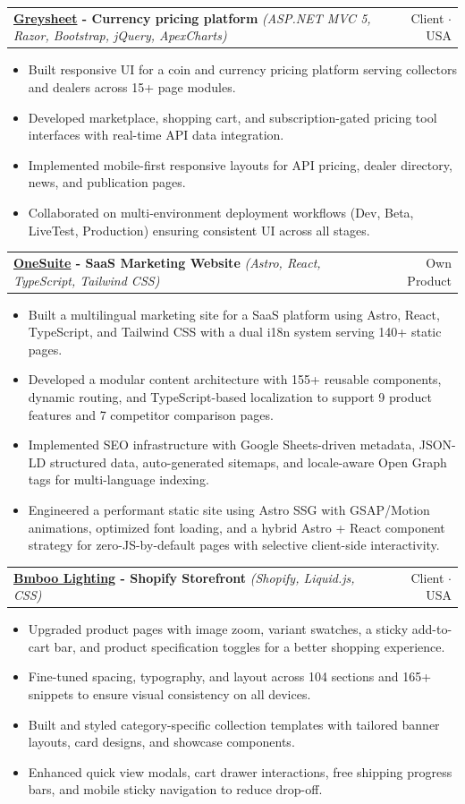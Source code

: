 \documentclass[10pt,letterpaper]{article}
\makeatletter
\newcommand{\project}[3]{%
  \begin{tabularx}{\textwidth}{@{}X r@{}}
    \textbf{#1} \textit{#2} & \hspace{1em}#3 \\
  \end{tabularx}\par\vspace{0pt}}
\makeatother
\begin{document}
\project{\href{https://greysheet.com}{Greysheet} - Currency pricing platform}{(ASP.NET MVC 5, Razor, Bootstrap, jQuery, ApexCharts)}{Client $\cdot$ USA}
\begin{itemize}
  \item Built responsive UI for a coin and currency pricing platform serving collectors and dealers across 15+ page modules.
  \item Developed marketplace, shopping cart, and subscription-gated pricing tool interfaces with real-time API data integration.
  \item Implemented mobile-first responsive layouts for API pricing, dealer directory, news, and publication pages.
  \item Collaborated on multi-environment deployment workflows (Dev, Beta, LiveTest, Production) ensuring consistent UI across all stages.
\end{itemize}
\vspace{3pt}

\project{\href{https://onesuite.io}{OneSuite} - SaaS Marketing Website}{(Astro, React, TypeScript, Tailwind CSS)}{Own Product}
\begin{itemize}
  \item Built a multilingual marketing site for a SaaS platform using Astro, React, TypeScript, and Tailwind CSS with a dual i18n system serving 140+ static pages.
  \item Developed a modular content architecture with 155+ reusable components, dynamic routing, and TypeScript-based localization to support 9 product features and 7 competitor comparison pages.
  \item Implemented SEO infrastructure with Google Sheets-driven metadata, JSON-LD structured data, auto-generated sitemaps, and locale-aware Open Graph tags for multi-language indexing.
  \item Engineered a performant static site using Astro SSG with GSAP/Motion animations, optimized font loading, and a hybrid Astro + React component strategy for zero-JS-by-default pages with selective client-side interactivity.
\end{itemize}
\vspace{3pt}

\project{\href{https://bmboo-lighting.com}{Bmboo Lighting} - Shopify Storefront}{(Shopify, Liquid.js, CSS)}{Client $\cdot$ USA}
\begin{itemize}
  \item Upgraded product pages with image zoom, variant swatches, a sticky add-to-cart bar, and product specification toggles for a better shopping experience.
  \item Fine-tuned spacing, typography, and layout across 104 sections and 165+ snippets to ensure visual consistency on all devices.
  \item Built and styled category-specific collection templates with tailored banner layouts, card designs, and showcase components.
  \item Enhanced quick view modals, cart drawer interactions, free shipping progress bars, and mobile sticky navigation to reduce drop-off.
\end{itemize}
\vspace{5pt}
\end{document}
